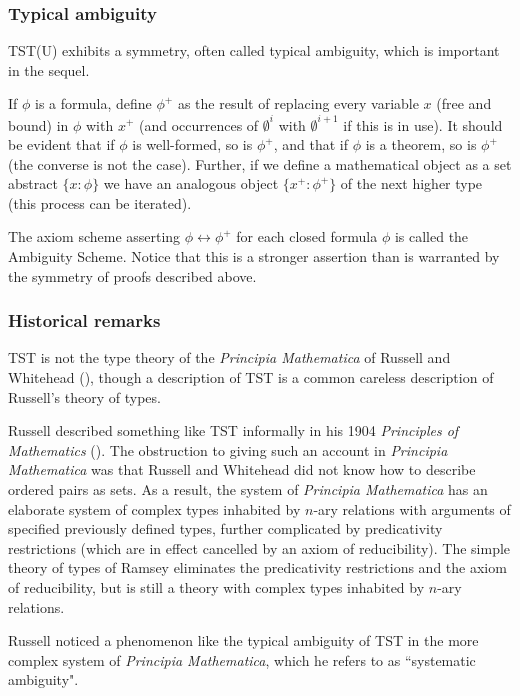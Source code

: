 \documentclass{article}
\theoremstyle{definition}
\theoremstyle{remark}
\begin{document}
\subsubsection{Typical ambiguity}

TST(U) exhibits a symmetry, often called typical ambiguity, which is important in the sequel.



If $\phi$ is a formula, define $\phi^+$ as the result of replacing every variable $x$ (free and bound) in $\phi$ with $x^+$ (and occurrences of $\emptyset^i$ with $\emptyset^{i+1}$ if this is in use).   It should be evident that if $\phi$ is well-formed, so is $\phi^+$,
and that if $\phi$ is a theorem, so is $\phi^+$ (the converse is not the case).  Further, if we define a mathematical object as a set abstract $\{x:\phi\}$ we have an analogous
object $\{x^+:\phi^+\}$ of the next higher type (this process can be iterated).

The axiom scheme asserting $\phi \leftrightarrow \phi^+$ for each closed formula $\phi$ is called the Ambiguity Scheme.   Notice that this is a stronger assertion than is warranted by the symmetry of proofs described above.

\subsubsection{Historical remarks}

TST is not the type theory of the {\em Principia Mathematica\/} of Russell and Whitehead (\cite{pm}), though a description of TST is a common careless description of Russell's theory of types.

Russell described something like TST informally in his 1904 {\em Principles of Mathematics\/} (\cite{pm1}).  The obstruction to giving such an account in {\em Principia Mathematica\/} was that
Russell and Whitehead did not know how to describe ordered pairs as sets.  As a result, the system of {\em Principia Mathematica\/} has an elaborate system of  complex
types inhabited by $n$-ary relations with arguments of specified previously defined types, further complicated by predicativity restrictions (which are in effect cancelled by an axiom of reducibility).
The simple theory of types of Ramsey eliminates the predicativity restrictions and the axiom of reducibility, but is still a theory with complex types inhabited by $n$-ary relations.

Russell noticed a phenomenon like the typical ambiguity of TST in the more complex system of {\em Principia Mathematica\/}, which he refers to as ``systematic ambiguity".
\end{document}
